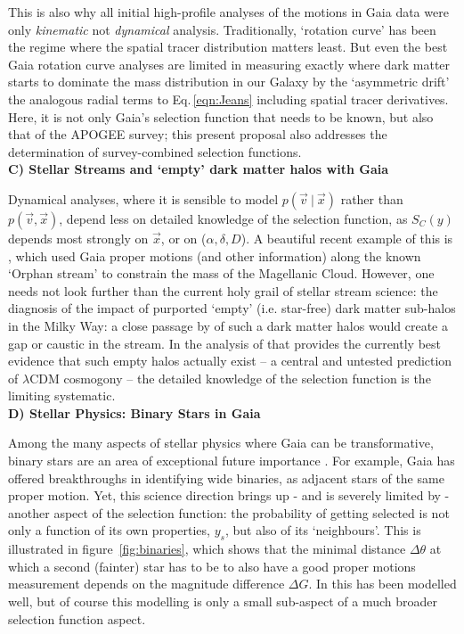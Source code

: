 This is also why all initial high-profile analyses of the motions in Gaia data 
\citep{Katz2018a,Antoja2018a} were only \emph{kinematic} not \emph{dynamical} analysis. Traditionally, `rotation curve' has been the regime where the spatial tracer distribution matters least. But even the best Gaia rotation curve analyses \citep[e.g.][]{Eilers2019a} are limited in measuring exactly where dark matter starts to dominate the mass distribution in our Galaxy by the `asymmetric drift' 
the analogous radial terms to Eq.\,\ref{eqn:Jeans} including spatial tracer derivatives. Here, it is not only Gaia's selection function that needs to be known, but also that of the APOGEE survey; this present proposal also addresses the determination of survey-combined selection functions.\\

\noindent\textbf{C) Stellar Streams and `empty' dark matter halos with Gaia\ }

Dynamical analyses, where it is sensible to model $p(\vec{v}~|~\vec{x})$ rather than $p(\vec{v},\vec{x})$, depend less on detailed knowledge of the selection function, as $S_C(y)$ depends most strongly on $\vec{x}$, or on ($\alpha,\delta,D$). A beautiful recent example of this is \citet{Erkal2019}, which used Gaia proper motions (and other information) along the known `Orphan stream' to constrain the mass of the Magellanic Cloud. 
However, one needs not look further than the current holy grail of stellar stream science: the diagnosis of the impact of purported `empty' (i.e. star-free) dark matter sub-halos in the Milky Way: a close passage by of such a dark matter halos would create a gap or caustic in the stream. In the analysis of \citet{Bonaca2019} that provides the currently best evidence that such empty halos actually exist -- a central and untested prediction of $\lambda$CDM cosmogony -- the detailed knowledge of the selection function is the limiting systematic. 
\\

\noindent\textbf{D) Stellar Physics: Binary Stars in Gaia}

Among the many aspects of stellar physics where Gaia can be transformative, binary stars are an area of exceptional future importance \citep[e.g.][]{Breivik2019}. For example, Gaia has offered breakthroughs in identifying wide binaries, as adjacent stars of the same proper motion. Yet, this science direction brings up - and is severely limited by - another aspect of the selection function: the probability of getting selected is not only a function of its own properties, $y_s$, but also of its `neighbours'. This is illustrated in figure~\ref{fig:binaries}, which shows that the minimal distance $\Delta\theta$ at which a second (fainter) star has to be to also have a good proper motions measurement depends on the magnitude difference $\Delta G$. In \citet{ElBadry2019} this has been modelled well, but of course this modelling is only a small sub-aspect of a much broader selection function aspect.

